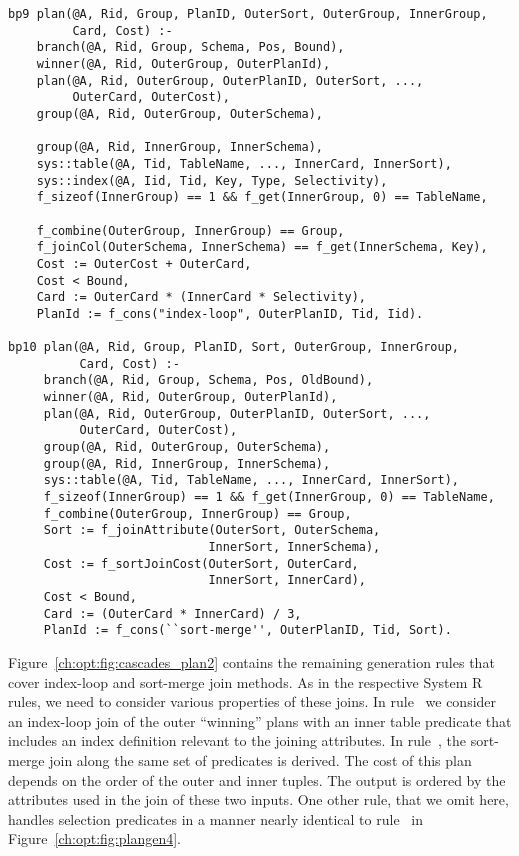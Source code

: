 \begin{figure*}
\ssp
\centering
\begin{lstlisting}
bp9 plan(@A, Rid, Group, PlanID, OuterSort, OuterGroup, InnerGroup, 
         Card, Cost) :-
    branch(@A, Rid, Group, Schema, Pos, Bound),
    winner(@A, Rid, OuterGroup, OuterPlanId),
    plan(@A, Rid, OuterGroup, OuterPlanID, OuterSort, ..., 
         OuterCard, OuterCost),
    group(@A, Rid, OuterGroup, OuterSchema),

    group(@A, Rid, InnerGroup, InnerSchema),
    sys::table(@A, Tid, TableName, ..., InnerCard, InnerSort),
    sys::index(@A, Iid, Tid, Key, Type, Selectivity),
    f_sizeof(InnerGroup) == 1 && f_get(InnerGroup, 0) == TableName,

    f_combine(OuterGroup, InnerGroup) == Group,
    f_joinCol(OuterSchema, InnerSchema) == f_get(InnerSchema, Key),
    Cost := OuterCost + OuterCard,
    Cost < Bound,
    Card := OuterCard * (InnerCard * Selectivity),
    PlanId := f_cons("index-loop", OuterPlanID, Tid, Iid).

bp10 plan(@A, Rid, Group, PlanID, Sort, OuterGroup, InnerGroup, 
          Card, Cost) :-
     branch(@A, Rid, Group, Schema, Pos, OldBound),
     winner(@A, Rid, OuterGroup, OuterPlanId),
     plan(@A, Rid, OuterGroup, OuterPlanID, OuterSort, ..., 
          OuterCard, OuterCost),
     group(@A, Rid, OuterGroup, OuterSchema),
     group(@A, Rid, InnerGroup, InnerSchema),
     sys::table(@A, Tid, TableName, ..., InnerCard, InnerSort),
     f_sizeof(InnerGroup) == 1 && f_get(InnerGroup, 0) == TableName,
     f_combine(OuterGroup, InnerGroup) == Group,
     Sort := f_joinAttribute(OuterSort, OuterSchema, 
                            InnerSort, InnerSchema),
     Cost := f_sortJoinCost(OuterSort, OuterCard, 
                            InnerSort, InnerCard),
     Cost < Bound,
     Card := (OuterCard * InnerCard) / 3,
     PlanId := f_cons(``sort-merge'', OuterPlanID, Tid, Sort).
\end{lstlisting}
\caption{\label{ch:opt:fig:cascades_plan2} Cascades plan generation rules for index-loop
and sort-merge join methods.}
\end{figure*}

Figure~\ref{ch:opt:fig:cascades_plan2} contains the remaining 
generation rules that cover index-loop and sort-merge join methods.  As in the
respective System R rules, we need to consider various properties of these
joins.  In rule~ we consider an index-loop join of the outer
``winning'' plans with an inner table predicate that includes an index
definition relevant to the joining attributes.  In rule~, the
sort-merge join along the same set of predicates is derived.  The cost of this
plan depends on the order of the outer and inner tuples.  The output is ordered
by the attributes used in the join of these two inputs.  One other rule, that
we omit here, handles selection predicates in a manner nearly identical to
rule~ in Figure~\ref{ch:opt:fig:plangen4}.

